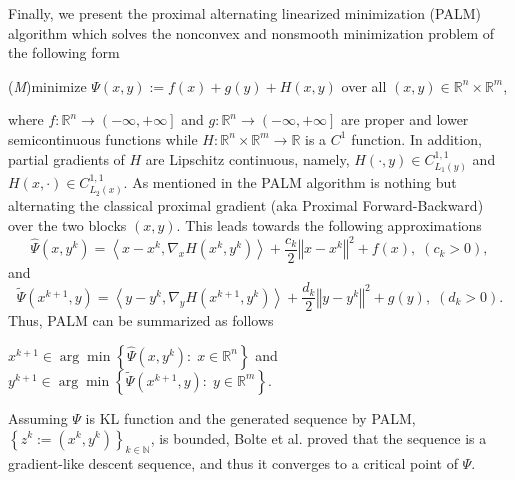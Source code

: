 \documentclass[12pt]{article}
\numberwithin{equation}{section}
\newcommand{\nn}{\mathbb{N}} %
\newcommand{\rr}{\mathbb{R}} %
\newcommand{\norm}[1]{\left\Vert {#1} \right\Vert} %
\begin{document}
Finally, we present the proximal alternating linearized minimization (PALM) algorithm which solves the nonconvex and nonsmooth minimization problem of the following form
\begin{center}
(\textit{M})\quad minimize $\Psi(x,y):=f(x)+g(y)+H(x,y)$ over all $(x,y) \in \mathbb{R}^n \times \mathbb{R}^m$,
\end{center}
where $f:\mathbb{R}^n \rightarrow \left(-\infty,+\infty\right]$ and $g:\mathbb{R}^n \rightarrow \left(-\infty,+\infty\right]$ are proper and lower semicontinuous functions while $H:\mathbb{R}^n \times \mathbb{R}^m \rightarrow \mathbb{R}$ is a $C^1$ function. In addition, partial gradients of $H$ are Lipschitz continuous, namely, $H(\cdot, y) \in C^{1,1}_{L_1(y)}$ and $H(x,\cdot) \in C^{1,1}_{L_2(x)}$.
As mentioned in \cite{BST2014} the PALM algorithm is nothing but alternating the classical proximal gradient (aka Proximal Forward-Backward) over the two blocks $(x,y)$. This leads towards the following approximations 
\begin{equation*}
	\widehat{\Psi}\left(x,y^k\right) = \left\langle x-x^k, \nabla_x H\left( x^k, y^k \right)\right\rangle + \frac{c_k}{2}\norm{x-x^k}^2 + f(x), \; (c_k>0),
\end{equation*}
and
\begin{equation*}
	\widetilde{\Psi}\left(x^{k+1},y\right) = \left\langle y-y^k, \nabla_y H\left( x^{k+1}, y^k \right)\right\rangle + \frac{d_k}{2}\norm{y-y^k}^2 + g(y), \; (d_k>0).
\end{equation*}
Thus, PALM can be summarized as follows
\begin{center}
$x^{k+1} \in \arg\!\min \left\lbrace \widehat{\Psi}(x,y^k) : \; x \in \rr^n \right\rbrace$ \quad and \quad $y^{k+1} \in \arg\!\min \left\lbrace \widetilde{\Psi}\left(x^{k+1},y\right) : \; y \in \rr^m \right\rbrace$.
\end{center}
Assuming $\Psi$ is KL function and the generated sequence by PALM, $\left\lbrace z^k:=\left( x^k, y^k\right)\right\rbrace_{k \in \nn}$, is bounded, Bolte et al. \cite{BST2014} proved that the sequence is a gradient-like descent sequence, and thus it converges to a critical point of $\Psi$. 
\end{document}
